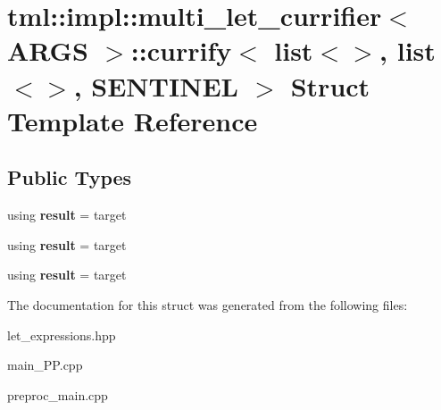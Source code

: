 \hypertarget{structtml_1_1impl_1_1multi__let__currifier_1_1currify_3_01list_3_4_00_01list_3_4_00_01SENTINEL_01_4}{\section{tml\+:\+:impl\+:\+:multi\+\_\+let\+\_\+currifier$<$ A\+R\+G\+S $>$\+:\+:currify$<$ list$<$$>$, list$<$$>$, S\+E\+N\+T\+I\+N\+E\+L $>$ Struct Template Reference}
\label{structtml_1_1impl_1_1multi__let__currifier_1_1currify_3_01list_3_4_00_01list_3_4_00_01SENTINEL_01_4}
}
\subsection*{Public Types}
\begin{DoxyCompactItemize}
\item 
\hypertarget{structtml_1_1impl_1_1multi__let__currifier_1_1currify_3_01list_3_4_00_01list_3_4_00_01SENTINEL_01_4_ade1d9c41fcd5c827bdf779fd100d8191}{using {\bfseries result} = target}\label{structtml_1_1impl_1_1multi__let__currifier_1_1currify_3_01list_3_4_00_01list_3_4_00_01SENTINEL_01_4_ade1d9c41fcd5c827bdf779fd100d8191}

\item 
\hypertarget{structtml_1_1impl_1_1multi__let__currifier_1_1currify_3_01list_3_4_00_01list_3_4_00_01SENTINEL_01_4_ade1d9c41fcd5c827bdf779fd100d8191}{using {\bfseries result} = target}\label{structtml_1_1impl_1_1multi__let__currifier_1_1currify_3_01list_3_4_00_01list_3_4_00_01SENTINEL_01_4_ade1d9c41fcd5c827bdf779fd100d8191}

\item 
\hypertarget{structtml_1_1impl_1_1multi__let__currifier_1_1currify_3_01list_3_4_00_01list_3_4_00_01SENTINEL_01_4_ade1d9c41fcd5c827bdf779fd100d8191}{using {\bfseries result} = target}\label{structtml_1_1impl_1_1multi__let__currifier_1_1currify_3_01list_3_4_00_01list_3_4_00_01SENTINEL_01_4_ade1d9c41fcd5c827bdf779fd100d8191}

\end{DoxyCompactItemize}


The documentation for this struct was generated from the following files\+:\begin{DoxyCompactItemize}
\item 
let\+\_\+expressions.\+hpp\item 
main\+\_\+\+P\+P.\+cpp\item 
preproc\+\_\+main.\+cpp\end{DoxyCompactItemize}
